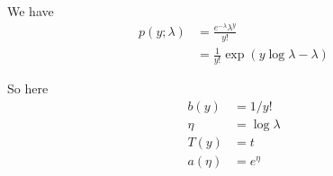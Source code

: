 \begin{answer}
    We have
    $$
    \begin{aligned}
p(y;\lambda)&= \frac{e^{-\lambda}\lambda ^y}{y!}\\
&= \frac{1}{y!}\exp (y\log \lambda - \lambda)
\end{aligned}
$$

So here
$$
\begin{aligned}
b(y) &= 1 / y!\\
\eta &= \log \lambda\\
T(y)&= t\\
a(\eta)&= e^{\eta}
\end{aligned}
$$
\end{answer}
